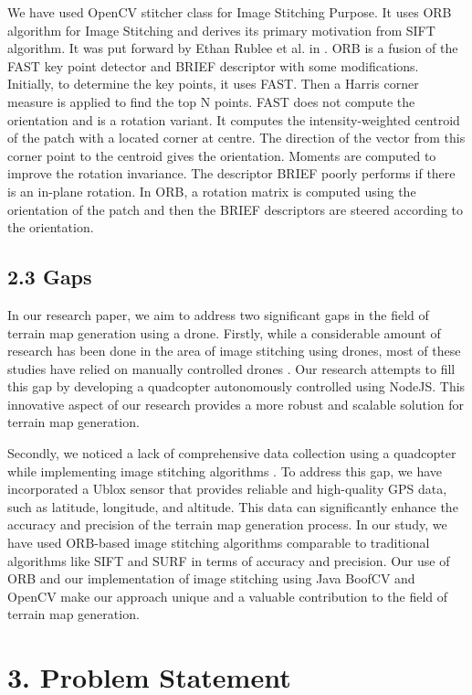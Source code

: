 \documentclass[
  journal=largetwo,
  manuscript=article-type,
  year=2023,
  volume=1,
]{iitp-journal}
\begin{document}
We have used OpenCV stitcher class for Image Stitching Purpose. It uses ORB algorithm for Image Stitching and derives its primary motivation from SIFT algorithm. It was put forward by Ethan Rublee et al. in \cite{7}. ORB is a fusion of the FAST key point detector and BRIEF descriptor with some 
modifications. Initially, to determine the key points, it uses FAST. Then a Harris corner measure is applied to find the top N points. FAST does not compute the orientation and is a rotation variant. It computes the intensity-weighted centroid of the patch with a located corner at centre. The direction of the vector from this corner point to the centroid gives the orientation. Moments are computed to improve the rotation invariance. The descriptor BRIEF poorly performs if there is an in-plane rotation. In ORB, a rotation matrix is computed using the orientation of the patch and then the BRIEF descriptors are steered according to the orientation. 

\subsection{2.3 Gaps}
In our research paper, we aim to address two significant gaps in the field of terrain map generation using a drone. Firstly, while a considerable amount of research has been done in the area of image stitching using drones, most of these studies have relied on manually controlled drones \cite{8}. Our research attempts to fill this gap by developing a quadcopter autonomously controlled using NodeJS. This innovative aspect of our research provides a more robust and scalable solution for terrain map generation.

Secondly, we noticed a lack of comprehensive data collection using a quadcopter while implementing image stitching algorithms \cite{9}. To address this gap, we have incorporated a Ublox sensor that provides reliable and high-quality GPS data, such as latitude, longitude, and altitude. This data can significantly enhance the accuracy and precision of the terrain map generation process. In our study, we have used ORB-based image stitching algorithms comparable to traditional algorithms like SIFT and SURF in terms of accuracy and precision. Our use of ORB and our implementation of image stitching using Java BoofCV and OpenCV make our approach unique and a valuable contribution to the field of terrain map generation.

\section{3. Problem Statement}
\end{document}
